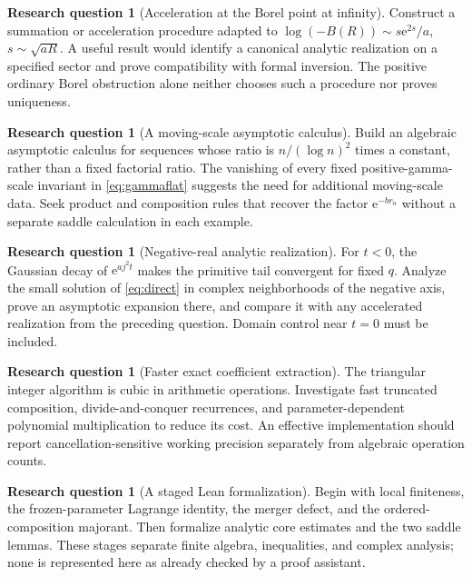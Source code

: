 \documentclass[11pt,a4paper]{article}
\numberwithin{equation}{section}
\theoremstyle{definition}
\newtheorem{question}[theorem]{Research question}
\theoremstyle{remark}\newtheorem{remark}[theorem]{Remark}
\newcommand{\ee}{\mathrm e}\newcommand{\dd}{\mathrm d}
\begin{document}
\begin{question}[Acceleration at the Borel point at infinity]
Construct a summation or acceleration procedure adapted to
$\log(-B(R))\sim s\ee^{2s}/a$, $s\sim\sqrt{aR}$.
A useful result would identify a canonical analytic realization on a
specified sector and prove compatibility with formal inversion. The positive
ordinary Borel obstruction alone neither chooses such a procedure nor
proves uniqueness.
\end{question}

\begin{question}[A moving-scale asymptotic calculus]
Build an algebraic asymptotic calculus for sequences whose ratio is
$n/(\log n)^2$ times a constant, rather than a fixed factorial ratio.
The vanishing of every fixed positive-gamma-scale invariant in
\eqref{eq:gammaflat} suggests the need for additional moving-scale data.
Seek product and composition rules that recover the factor $\ee^{-br_n}$
without a separate saddle calculation in each example.
\end{question}

\begin{question}[Negative-real analytic realization]
For $t<0$, the Gaussian decay of $\ee^{aj^2t}$ makes the primitive tail
convergent for fixed $q$. Analyze the small solution of \eqref{eq:direct}
in complex neighborhoods of the negative axis, prove an asymptotic expansion
there, and compare it with any accelerated realization from the preceding
question. Domain control near $t=0$ must be included.
\end{question}

\begin{question}[Faster exact coefficient extraction]
The triangular integer algorithm is cubic in arithmetic operations.
Investigate fast truncated composition, divide-and-conquer recurrences,
and parameter-dependent polynomial multiplication to reduce its cost.
An effective implementation should report cancellation-sensitive working
precision separately from algebraic operation counts.
\end{question}

\begin{question}[A staged Lean formalization]
Begin with local finiteness, the frozen-parameter Lagrange identity,
the merger defect, and the ordered-composition majorant. Then formalize
analytic core estimates and the two saddle lemmas. These stages separate
finite algebra, inequalities, and complex analysis; none is represented
here as already checked by a proof assistant.
\end{question}
\end{document}
